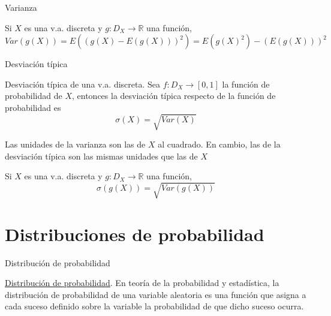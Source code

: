 \documentclass[
  ignorenonframetext,
]{beamer}
\begin{document}
\begin{frame}{Varianza}
\protect\hypertarget{varianza-1}{}

Si \(X\) es una v.a. discreta y \(g:D_X\longrightarrow \mathbb{R}\) una
función, \[Var(g(X))=E((g(X)-E(g(X)))^2)=E(g(X)^2)-(E(g(X)))^2\]

\end{frame}

\begin{frame}{Desviación típica}
\protect\hypertarget{desviaciuxf3n-tuxedpica}{}

Desviación típica de una v.a. discreta. Sea
\(f:D_X\longrightarrow[0,1]\) la función de probabilidad de \(X\),
entonces la desviación típica respecto de la función de probabilidad es
\[\sigma(X)=\sqrt{Var(X)}\]

Las unidades de la varianza son las de \(X\) al cuadrado. En cambio, las
de la desviación típica son las mismas unidades que las de \(X\)

Si \(X\) es una v.a. discreta y \(g:D_X\longrightarrow \mathbb{R}\) una
función, \[\sigma(g(X))=\sqrt{Var(g(X))}\]

\end{frame}

\hypertarget{distribuciones-de-probabilidad}{%
\section{Distribuciones de
probabilidad}\label{distribuciones-de-probabilidad}}

\begin{frame}{Distribución de probabilidad}
\protect\hypertarget{distribuciuxf3n-de-probabilidad}{}

\href{https://es.wikipedia.org/wiki/Distribución_de_probabilidad}{Distribución
de probabilidad}. En teoría de la probabilidad y estadística, la
distribución de probabilidad de una variable aleatoria es una función
que asigna a cada suceso definido sobre la variable la probabilidad de
que dicho suceso ocurra.

\end{frame}
\end{document}
